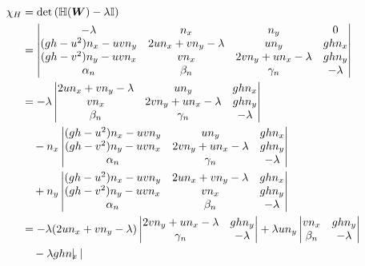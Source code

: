 \documentclass[11pt, a4paper, oneside]{report}
\begin{document}
\begin{appendices}
\begin{align}
    \chi_H & = \det \left(\mathbb{H}(\bm{W}) - \lambda \mathbb{I}\right) \notag \\
    & = \begin{vmatrix}
        -\lambda & n_x & n_y & 0 \\
        (gh - u^2) n_x - uv n_y & 2u n_x + v n_y - \lambda & u n_y & gh n_x \\
        (gh - v^2) n_y - uv n_x & v n_x & 2v n_y + u n_x - \lambda & gh n_y \\
        \alpha_n & \beta_n & \gamma_n & -\lambda
    \end{vmatrix} \notag \\
    & = -\lambda \begin{vmatrix}
        2u n_x + v n_y - \lambda & u n_y & gh n_x \\
        v n_x & 2v n_y + u n_x - \lambda & gh n_y \\
        \beta_n & \gamma_n & - \lambda
    \end{vmatrix} \notag \\
    & \quad - n_x \begin{vmatrix}
        (gh - u^2) n_x - uv n_y & u n_y & gh n_x \\
        (gh - v^2) n_y - uv n_x & 2v n_y + u n_x - \lambda & gh n_y \\
        \alpha_n & \gamma_n & -\lambda
    \end{vmatrix} \notag \\
    & \quad + n_y \begin{vmatrix}
        (gh - u^2) n_x - uv n_y & 2u n_x + v n_y - \lambda & gh n_x \\
        (gh - v^2) n_y - uv n_x & v n_x & gh n_y \\
        \alpha_n & \beta_n & -\lambda
    \end{vmatrix} \notag \\
    & = - \lambda (2u n_x + v n_y - \lambda) \begin{vmatrix}
        2v n_y + u n_x - \lambda & gh n_y \\
        \gamma_n & -\lambda
    \end{vmatrix}
    + \lambda u n_y \begin{vmatrix}
        v n_x & gh n_y \\
        \beta_n & - \lambda
    \end{vmatrix} \notag \\
    & \quad - \lambda gh n_x \begin{vmatrix}

\end{vmatrix}
\end{align}
\end{appendices}
\end{document}
